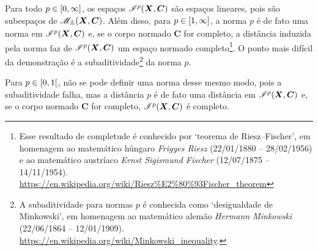 Para todo $p \in \left[{0},{\infty}\right]$, os espaços $\mathscr{I}^p(\bm X,\bm C)$ são espaços lineares, pois são subespaços de $\mathscr{M}_{\circeq}(\bm X,\bm C)$. Além disso, para $p \in \left[{1},{\infty}\right]$, a norma $p$ é de fato uma norma em $\mathscr{I}^p(\bm X,\bm C)$ e, se o corpo normado $\bm C$ for completo, a distância induzida pela norma faz de $\mathscr{I}^p(\bm X,\bm C)$ um espaço normado completo\footnote{Esse resultado de completude é conhecido por `teorema de Riesz–Fischer', em homenagem ao matemático húngaro \textit{Frigyes Riesz} (22/01/1880 -- 28/02/1956) e ao matemático austríaco \textit{Ernst Sigismund Fischer} (12/07/1875 -- 14/11/1954). \url{https://en.wikipedia.org/wiki/Riesz\%E2\%80\%93Fischer_theorem}}. O ponto mais difícil da demonstração é a subaditividade\footnote{A subaditividade para normas $p$ é conhecida como `desigualdade de Minkowski', em homenagem ao matemático alemão \textit{Hermann Minkowski} (22/06/1864 -- 12/01/1909). \url{https://en.wikipedia.org/wiki/Minkowski_inequality}.} da norma $p$.

Para $p \in \left[{0},{1}\right[$, não se pode definir uma norma desse mesmo modo, pois a subaditividade falha, mas a distância $p$ é de fato uma distância em $\mathscr{I}^p(\bm X,\bm C)$ e, se o corpo normado $\bm C$ for completo, $\mathscr{I}^p(\bm X,\bm C)$ é completo.

